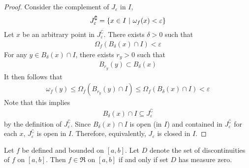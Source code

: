 \documentclass[thmcnt=section, 12pt]{my-elegantbook}
\begin{document}
\begin{proof}
	Consider the complement of $J_\varepsilon$ in $I$,
	\begin{align*}
		J_\varepsilon^\complement
		= \left\{ x \in I \ \middle| \ \omega_f(x) < \varepsilon \right\}
	\end{align*}
	Let $x$ be an arbitrary point in $J_\varepsilon^\complement$.
	There exists $\delta > 0$ such that 
	\begin{align*}
		\Omega_f(B_\delta (x) \cap I) < \varepsilon
	\end{align*}
	For any $y \in B_\delta(x) \cap I$, 
	there exists $r_y > 0$ such that 
	\begin{align*}
		B_{r_y}(y) \subset B_{\delta}(x)
	\end{align*}
	It then follows that 
	\begin{align*}
		\omega_f(y) \leq \Omega_f(B_{r_y}(y) \cap I)
		\leq \Omega_f(B_\delta(x) \cap I)
		< \varepsilon
	\end{align*}
	Note that this implies
	\begin{align*}
		B_\delta(x) \cap I \subseteq J_\varepsilon^\complement
	\end{align*}
	by the definition of $J_\varepsilon^\complement$.
	Since $B_\delta(x) \cap I$ is open (in $I$) and contained
	in $J_\varepsilon^\complement$ for each $x$,
	$J_\varepsilon^\complement$ is open in $I$.
	Therefore, equivalently, $J_\varepsilon$ is closed in $I$.
\end{proof}


\begin{theorem} \label{thm:89} 
	Let $f$ be defined and bounded on $[a, b]$.
	Let $D$ denote the set of discontinuities of $f$ on $[a, b]$.
	Then $f \in \mathfrak{R}$ on $[a, b]$
	if and only if 
	set $D$ has measure zero.
\end{theorem}
\end{document}
